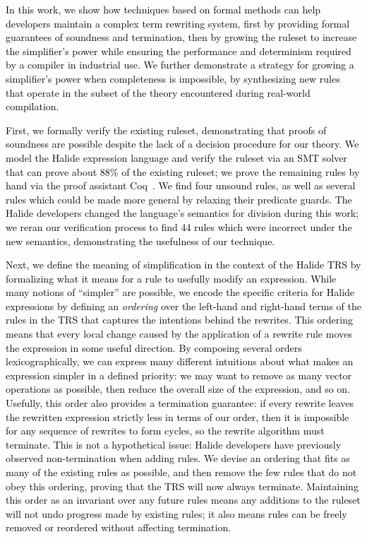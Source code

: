 \documentclass[acmsmall]{acmart}\settopmatter{}
\newcommand{\modified}[1]{\textcolor{black}{{#1}}}
\begin{document}
\modified{ In this work, we show how techniques based on formal methods can help developers
 maintain a complex term rewriting system, first by providing formal guarantees 
 of soundness and termination, then by growing the ruleset to increase the simplifier's 
 power while ensuring the performance and determinism required by a compiler in 
 industrial use.  We further demonstrate a strategy for growing a simplifier's power
 when completeness is impossible, by synthesizing new rules that operate in
 the subset of the theory encountered during real-world compilation.}

\modified{First, we formally verify the existing 
ruleset, demonstrating that proofs of soundness are possible despite the lack of a 
decision procedure for our theory. We model the Halide expression language and verify 
the ruleset via an SMT solver that can prove about 88\% of the existing ruleset;
we prove the remaining rules by hand via the proof assistant Coq~\cite{Coq19}. We find four unsound rules, 
as well as several rules which could be made more general by relaxing their predicate guards. 
The Halide developers changed the language's semantics for division during this work; we reran our verification 
process to find 44 rules which were incorrect under the new semantics, demonstrating 
the usefulness of our technique.}

\modified{Next, we define the meaning of simplification in the context of the Halide TRS
by formalizing what it means for a rule to usefully modify an expression.  While
many notions of ``simpler'' are possible, we encode the specific criteria for Halide
expressions by defining an \emph{ordering} over the left-hand and right-hand terms of 
the rules in the TRS that captures the intentions behind the rewrites. This ordering 
means that every local change caused by the application of a rewrite rule moves the 
expression in some useful direction. By composing several orders lexicographically, 
we can express many different intuitions about what makes an expression simpler in a
defined priority: we may want to remove as many vector operations as possible, 
then reduce the overall size of the expression, and so on. Usefully, this order also provides a termination guarantee: 
if every rewrite leaves the rewritten expression strictly less in terms of our order, 
then it is impossible for any sequence of rewrites to form cycles, so the rewrite 
algorithm must terminate. This is not a hypothetical issue: Halide developers have previously
observed non-termination when adding rules.  We devise an ordering that fits as many of the existing rules as 
possible, and then remove the few rules that do not obey this ordering, proving
that the TRS will now always terminate. Maintaining this order as 
an invariant over any future rules means any additions to the ruleset will not undo 
progress made by existing rules; it also means rules can be freely removed or reordered 
without affecting termination.}
\end{document}
